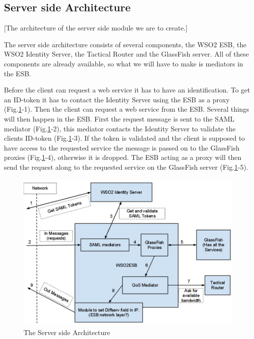 \documentclass[12pt]{article}
\begin{document}
    \subsection{Server side Architecture}\label{serversidearch} [The architecture of the server side module we are to create.] 
    
        The server side architecture consists of several components, the WSO2 ESB, the WSO2 Identity Server, the Tactical Router and the GlassFish server. All of these components are already available, so what we will have to make is mediators in the ESB.

        Before the client can request a web service it has to have an identification. To get an ID-token it has to contact the Identity Server using the ESB as a proxy (Fig.\ref{fig:serverside}-1). Then the client can request a web service from the ESB. Several things will then happen in the ESB. First the request message is sent to the SAML mediator (Fig.\ref{fig:serverside}-2), this mediator contacts the Identity Server to validate the clients ID-token (Fig.\ref{fig:serverside}-3). If the token is validated and the client is supposed to have access to the requested service the message is passed on to the GlassFish proxies (Fig.\ref{fig:serverside}-4), otherwise it is dropped. The ESB acting as a proxy will then send the request along to the requested service on the GlassFish server (Fig.\ref{fig:serverside}-5).
        
        \begin{figure}[htb]
            \includegraphics[scale=0.4]{serverside}
            \caption{The Server side Architecture}
            \label{fig:serverside}
        \end{figure}
\end{document}
